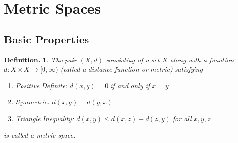 \documentclass[11pt, a4paper]{memoir}
\theoremstyle{change}
\theoremstyle{plain}
\theoremstyle{nonumberplain}
\newtheorem{definition}{Definition.}
\numberwithin{equation}{section}
\begin{document}
\section{Metric Spaces}
\subsection{Basic Properties}
\begin{definition}
    The pair $(X,d)$ consisting of a set $X$ along with a function $d:X\times X\to[0,\infty)$ (called a distance function or
    metric) satisfying
    \begin{enumerate}
        \item Positive Definite: $d(x,y)=0$ if and only if $x=y$
        \item Symmetric: $d(x,y)=d(y,x)$
        \item Triangle Inequality: $d(x,y)\leq d(x,z)+d(z,y)$ for all $x,y,z$
    \end{enumerate}
    is called a metric space.
\end{definition}
\end{document}
